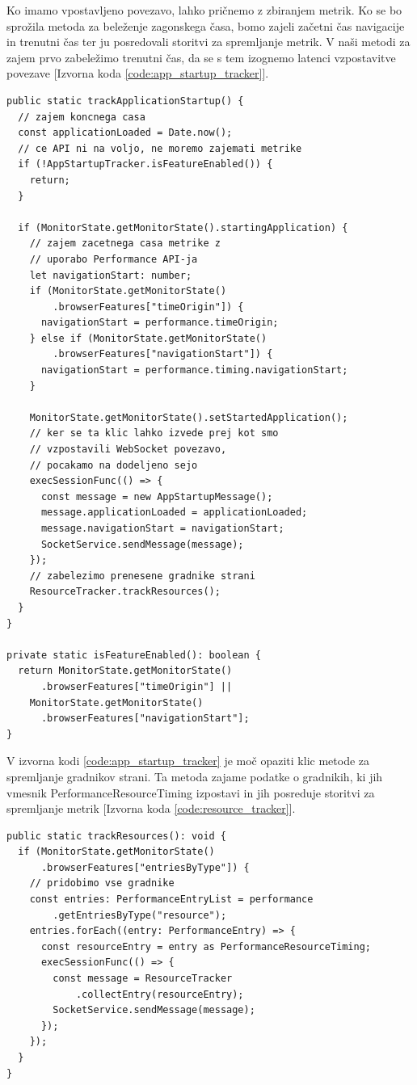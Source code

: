 \documentclass[a4paper, 12pt]{book}
\begin{document}
Ko imamo vpostavljeno povezavo, lahko pričnemo z zbiranjem metrik. Ko se bo sprožila metoda za beleženje zagonskega časa, bomo zajeli začetni čas navigacije in trenutni čas ter ju posredovali storitvi za spremljanje metrik. V naši metodi za zajem prvo zabeležimo trenutni čas, da se s tem izognemo latenci vzpostavitve povezave [Izvorna koda \ref{code:app_startup_tracker}].

\begin{lstlisting}[label=code:app_startup_tracker, caption=Zajemanje zagonskega časa aplikacije]
public static trackApplicationStartup() {
  // zajem koncnega casa
  const applicationLoaded = Date.now();
  // ce API ni na voljo, ne moremo zajemati metrike
  if (!AppStartupTracker.isFeatureEnabled()) {
    return;
  }

  if (MonitorState.getMonitorState().startingApplication) {
    // zajem zacetnega casa metrike z
    // uporabo Performance API-ja
    let navigationStart: number;
    if (MonitorState.getMonitorState()
        .browserFeatures["timeOrigin"]) {
      navigationStart = performance.timeOrigin;
    } else if (MonitorState.getMonitorState()
        .browserFeatures["navigationStart"]) {
      navigationStart = performance.timing.navigationStart;
    }

    MonitorState.getMonitorState().setStartedApplication();
    // ker se ta klic lahko izvede prej kot smo
    // vzpostavili WebSocket povezavo,
    // pocakamo na dodeljeno sejo
    execSessionFunc(() => {
      const message = new AppStartupMessage();
      message.applicationLoaded = applicationLoaded;
      message.navigationStart = navigationStart;
      SocketService.sendMessage(message);
    });
    // zabelezimo prenesene gradnike strani
    ResourceTracker.trackResources();
  }
}

private static isFeatureEnabled(): boolean {
  return MonitorState.getMonitorState()
      .browserFeatures["timeOrigin"] ||
    MonitorState.getMonitorState()
      .browserFeatures["navigationStart"];
}
\end{lstlisting}

V izvorna kodi \ref{code:app_startup_tracker} je moč opaziti klic metode za spremljanje gradnikov strani. Ta metoda zajame podatke o gradnikih, ki jih vmesnik PerformanceResourceTiming izpostavi in jih posreduje storitvi za spremljanje metrik [Izvorna koda \ref{code:resource_tracker}]. 

\begin{lstlisting}[label=code:resource_tracker, caption=Zajemanje gradnikov aplikacije]
public static trackResources(): void {
  if (MonitorState.getMonitorState()
      .browserFeatures["entriesByType"]) {
    // pridobimo vse gradnike
    const entries: PerformanceEntryList = performance
        .getEntriesByType("resource");
    entries.forEach((entry: PerformanceEntry) => {
      const resourceEntry = entry as PerformanceResourceTiming;
      execSessionFunc(() => {
        const message = ResourceTracker
            .collectEntry(resourceEntry);
        SocketService.sendMessage(message);
      });
    });
  }
}
\end{lstlisting}
\end{document}

